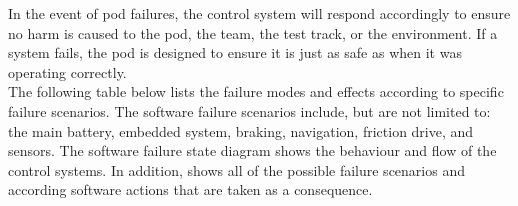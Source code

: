   In the event of pod failures, the control system will respond accordingly to ensure no harm is caused to the pod, the team, the test track, or the environment. If a system fails, the pod is designed to ensure it is just as safe as when it was operating correctly.\\
  The following table below lists the failure modes and effects according to specific failure scenarios. The software failure scenarios include, but are not limited to: the main battery, embedded system, braking, navigation, friction drive, and sensors.
  The software failure state diagram  shows the behaviour and flow of the control systems. In addition,  shows all of the possible failure scenarios and according software actions that are taken as a consequence.\\
  
